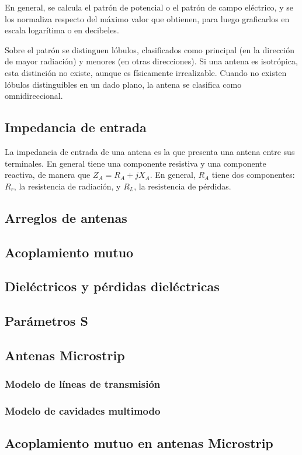 En general, se calcula el patrón de potencial o el patrón de campo eléctrico, y se los normaliza respecto del máximo valor que obtienen, para luego graficarlos en escala logarítima o en decibeles.

Sobre el patrón se distinguen lóbulos, clasificados como principal (en la dirección de mayor radiación) y menores (en otras direcciones). Si una antena es isotrópica, esta distinción no existe, aunque es físicamente irrealizable. Cuando no existen lóbulos distinguibles en un dado plano, la antena se clasifica como omnidireccional.

\subsection{Impedancia de entrada}
\label{subsec_imp_entrada}
La impedancia de entrada de una antena es la que presenta una antena entre sus terminales. En general tiene una componente resistiva y una componente reactiva, de manera que $Z_A = R_A + j X_A$. En general, $R_A$ tiene dos componentes: $R_r$, la resistencia de radiación, y $R_L$, la resistencia de pérdidas.

\subsection{Arreglos de antenas}

\subsection{Acoplamiento mutuo}
\label{subsec_acoplamiento}
\lipsum[2]
\subsection{Dieléctricos y pérdidas dieléctricas}
\label{subsec_dielectricos}
\lipsum[2]
\subsection{Parámetros S}
\label{subsec_parametros_s}
\lipsum

\subsection{Antenas Microstrip}
\label{subsec_antenas_microstrip}
\lipsum
\subsubsection{Modelo de líneas de transmisión}
\label{subsubsec_microstrip_modeloLineas}
\lipsum
\subsubsection{Modelo de cavidades multimodo}
\label{subsubsec_microstrip_modeloCavidades}
\lipsum


\subsection{Acoplamiento mutuo en antenas Microstrip}
\label{subsec_acoplamiento_microstrip}
\lipsum


